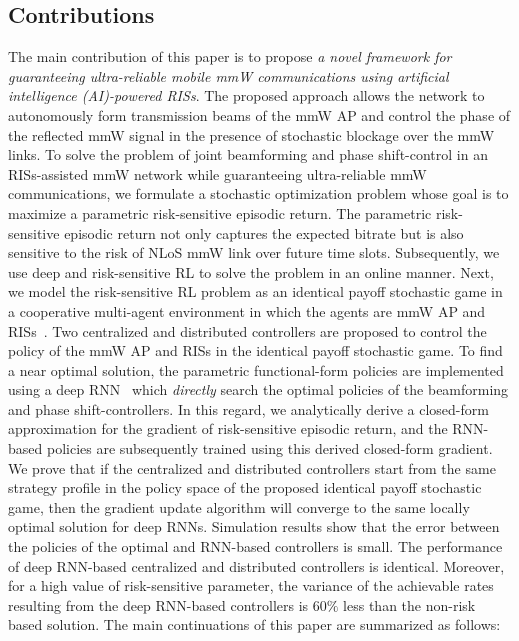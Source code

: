 \documentclass[conference]{IEEEtran}
\begin{document}
\subsection{Contributions}
The main contribution of this paper is to propose \emph{a novel framework for guaranteeing ultra-reliable mobile mmW communications using artificial intelligence (AI)-powered RISs}. The proposed approach allows the network to autonomously form transmission beams of the mmW AP and control the phase of the reflected mmW signal in the presence of stochastic blockage over the mmW links. To solve the problem of joint beamforming and phase shift-control in an RISs-assisted mmW network while guaranteeing ultra-reliable mmW communications, we formulate a stochastic optimization problem whose goal is to maximize a parametric risk-sensitive episodic return. The parametric risk-sensitive episodic return not only captures the expected bitrate but is also sensitive to the risk of NLoS mmW link over future time slots. Subsequently, we use deep and risk-sensitive RL to solve the problem in an online manner. Next, we model the risk-sensitive RL problem as an identical payoff stochastic game in a cooperative multi-agent environment in which the agents are mmW AP and RISs~\cite{Walidbook2000}. Two centralized and distributed controllers are proposed to control the policy of the mmW AP and RISs in the identical payoff stochastic game. To find a near optimal solution, the parametric functional-form policies are implemented using a deep RNN~\cite{Walid2017} which \emph{directly} search the optimal policies of the beamforming and phase shift-controllers. In this regard, we analytically derive a closed-form approximation for the gradient of risk-sensitive episodic return, and the RNN-based policies are subsequently trained using this derived closed-form gradient. We prove that if the centralized and distributed controllers start from the same strategy profile in the policy space of the proposed identical payoff stochastic game, then the gradient update algorithm will converge to the same locally optimal solution for deep RNNs. Simulation results show that the error between the policies of the optimal and RNN-based controllers is small. The performance of deep RNN-based centralized and distributed controllers is identical. Moreover, for a high value of risk-sensitive parameter, the variance of the achievable rates resulting from the deep RNN-based controllers is $60\%$ less than the non-risk based solution. The main continuations of this paper are summarized as follows:
\end{document}
